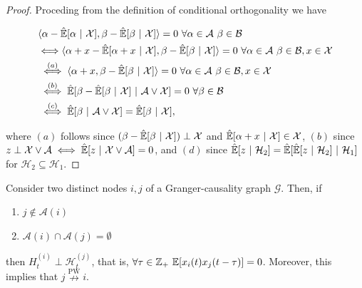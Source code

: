 \documentclass[12pt]{article}
\def\npwgc{\overset{\text{PW}}{\nrightarrow}}  %
\def\gcg{\mathcal{G}}  %
\def\H{\mathcal{H}}  %
\newcommand{\linE}[2]{\hat{\E}[#1\ |\ #2]}  %
\newcommand{\anc}[1]{\mathcal{A}(#1)}  %
\begin{document}
\begin{proof}
  Proceding from the definition of conditional orthogonality we have

  \begin{align*}
    &\inner{\alpha - \linE{\alpha}{\mathcal{X}}}{\beta - \linE{\beta}{\mathcal{X}}} = 0 \ \forall \alpha \in \mathcal{A}\ \beta \in \mathcal{B}\\
    &{\iff} \inner{\alpha + x - \linE{\alpha + x}{\mathcal{X}}}{\beta - \linE{\beta}{\mathcal{X}}} = 0 \ \forall \alpha \in \mathcal{A}\ \beta \in \mathcal{B}, x \in \mathcal{X}\\
    &\overset{(a)}{\iff} \inner{\alpha + x}{\beta - \linE{\beta}{\mathcal{X}}} = 0 \ \forall \alpha \in \mathcal{A}\ \beta \in \mathcal{B}, x \in \mathcal{X}\\
    &\overset{(b)}{\iff} \linE{\beta - \linE{\beta}{\mathcal{X}}}{\mathcal{A} \vee \mathcal{X}} = 0\ \forall \beta \in \mathcal{B}\\
    &\overset{(c)}{\iff} \linE{\beta}{\mathcal{A} \vee \mathcal{X}} = \linE{\beta}{\mathcal{X}},
  \end{align*}

  where $(a)$ follows since $(\beta - \linE{\beta}{\mathcal{X}}) \perp \mathcal{X}$ and $\linE{\alpha + x}{\mathcal{X}} \in \mathcal{X}$, $(b)$ since $z \perp \mathcal{X} \vee \mathcal{A} \iff \linE{z}{\mathcal{X} \vee \mathcal{A}} = 0$, and $(d)$ since $\linE{z}{\H_2} = \linE{\linE{z}{\H_2}}{\H_1}$ for $\H_2 \subseteq \H_1$.
  

\end{proof}

\begin{proposition}
  \label{prop:ancestor_properties}
  Consider two distinct nodes $i, j$ of a Granger-causality graph
  $\gcg$.  Then, if

  \begin{enumerate}[label=(\alph*)]
    \item{$j \not\in \anc{i}$}
    \item{$\anc{i}\cap\anc{j} = \emptyset$}
  \end{enumerate}

  then $H_t^{(i)} \perp \H_t^{(j)}$, that is,
  $\forall \tau \in \Z_+\ \E[x_i(t)x_j(t - \tau)] = 0$.  Moreover,
  this implies that $j \npwgc i$.
\end{proposition}
\end{document}
